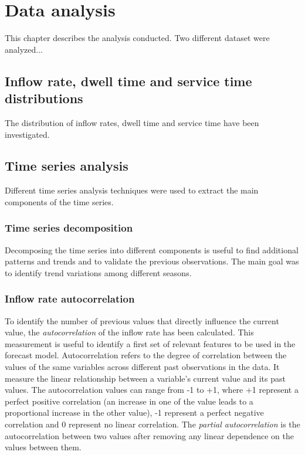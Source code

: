 \chapter{Data analysis}
\label{cha:data_analysis}

This chapter describes the analysis conducted.
Two different dataset were analyzed...


\section{Inflow rate, dwell time and service time distributions}
\label{sec:rates_distributions}
The distribution of inflow rates, dwell time and service time have been investigated.

\section{Time series analysis}
\label{sec:time_series_analysis}
Different time series analysis techniques were used to extract the main components of the time series.

\subsection{Time series decomposition}
\label{subsec:autocorrelation}
Decomposing the time series into different components is useful to find additional patterns and trends and to validate the previous observations. The main goal was to identify trend variations among different seasons.


\subsection{Inflow rate autocorrelation}
\label{subsec:autocorrelation}
To identify the number of previous values that directly influence the current value, the \emph{autocorrelation} of the inflow rate has been calculated. This measurement is useful to identify a first set of relevant features to be used in the forecast model.
Autocorrelation refers to the degree of correlation between the values of the same variables across different past observations in the data. It measure the linear relationship between a variable's current value and its past values. The autocorrelation values can range from -1 to +1, where +1 represent a perfect positive correlation (an increase in one of the value leads to a proportional increase in the other value), -1 represent a perfect negative correlation and 0 represent no linear correlation.
The \emph{partial autocorrelation} is the autocorrelation between two values after removing any linear dependence on the values between them.

